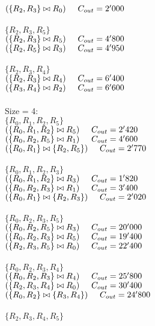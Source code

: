 \documentclass[11pt, a4]{article}
\newcommand\tab[1][0.5cm]{\hspace*{#1}}
\begin{document}
\tab \sout{$(\{R_2, R_3\} \bowtie R_0) \tab C_{out} = 2'000$}\\
\\
$\{R_2, R_3, R_5\}$\\
\tab $(\{R_2, R_3\} \bowtie R_5) \tab C_{out} = 4'800$\\
\tab \sout{$(\{R_2, R_5\} \bowtie R_3) \tab C_{out} = 4'950$}\\
\\
$\{R_2, R_3, R_4\}$\\
\tab $(\{R_2, R_3\} \bowtie R_4) \tab C_{out} = 6'400$\\
\tab \sout{$(\{R_3, R_4\} \bowtie R_2) \tab C_{out} = 6'600$}\\
\\
Size = 4:\\
$\{R_0, R_1, R_2, R_5\}$\\
\tab $(\{R_0, R_1, R_2\} \bowtie R_5) \tab C_{out} = 2'420$\\
\tab \sout{$(\{R_0, R_2, R_5\} \bowtie R_1) \tab C_{out} = 4'600$}\\
\tab \sout{$(\{R_0, R_1\} \bowtie \{R_2, R_5\}) \tab C_{out} = 2'770$}\\
\\
$\{R_0, R_1, R_2, R_3\}$\\
\tab $(\{R_0, R_1, R_2\} \bowtie R_3) \tab C_{out} = 1'820$\\
\tab \sout{$(\{R_0, R_2, R_3\} \bowtie R_1) \tab C_{out} = 3'400$}\\
\tab \sout{$(\{R_0, R_1\} \bowtie \{R_2, R_3\}) \tab C_{out} = 2'020$}\\
\\
$\{R_0, R_2, R_3, R_5\}$\\
\tab \sout{$(\{R_0, R_2, R_5\} \bowtie R_3) \tab C_{out} = 20'000$}\\
\tab $(\{R_0, R_2, R_3\} \bowtie R_5) \tab C_{out} = 19'400$\\
\tab \sout{$(\{R_2, R_3, R_5\} \bowtie R_0) \tab C_{out} = 22'400$}\\
\\
$\{R_0, R_2, R_3, R_4\}$\\
\tab \sout{$(\{R_0, R_2, R_3\} \bowtie R_4) \tab C_{out} = 25'800$}\\
\tab \sout{$(\{R_2, R_3, R_4\} \bowtie R_0) \tab C_{out} = 30'400$}\\
\tab $(\{R_0, R_2\} \bowtie \{R_3, R_4\}) \tab C_{out} = 24'800$\\
\\
$\{R_2, R_3, R_4, R_5\}$\\
\end{document}
